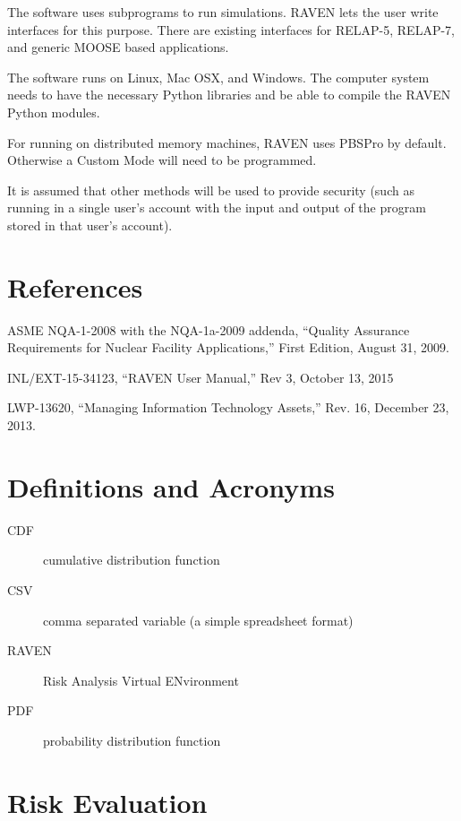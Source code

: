 \documentclass{article}
\begin{document}
The software uses subprograms to run simulations.  RAVEN lets the user
write interfaces for this purpose.  There are existing interfaces for
RELAP-5, RELAP-7, and generic MOOSE based applications.

The software runs on Linux, Mac OSX, and Windows.  The computer system
needs to have the necessary Python libraries and be able to compile
the RAVEN Python modules.

For running on distributed memory machines, RAVEN uses PBSPro by
default.  Otherwise a Custom Mode will need to be programmed.

It is assumed that other methods will be used to provide security
(such as running in a single user's account with the input and output
of the program stored in that user's account).

\section{References}

\begin{flushleft}
ASME NQA-1-2008 with the NQA-1a-2009 addenda, ``Quality Assurance
Requirements for Nuclear Facility Applications,'' First Edition, August
31, 2009.

INL/EXT-15-34123, ``RAVEN User Manual,'' Rev 3, October 13, 2015

LWP-13620, ``Managing Information Technology Assets,'' Rev. 16, December
23, 2013.
\end{flushleft}

\section{Definitions and Acronyms}

\begin{description}
\item[CDF] cumulative distribution function
\item[CSV] comma separated variable (a simple spreadsheet format)
\item[RAVEN] Risk Analysis Virtual ENvironment
\item[PDF] probability distribution function
\end{description}

\section{Risk Evaluation}
\end{document}
